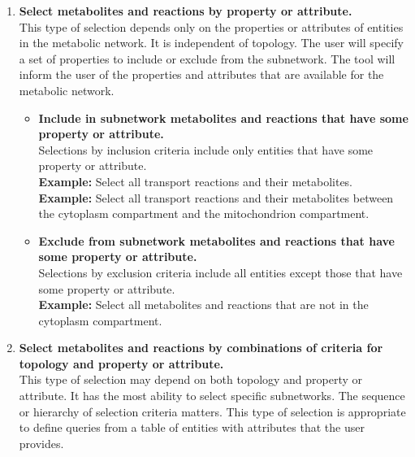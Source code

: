 \begin{enumerate}
\item \textbf{Select metabolites and reactions by property or attribute.}
\\ This type of selection depends only on the properties or attributes of entities in the metabolic network.
It is independent of topology.
The user will specify a set of properties to include or exclude from the subnetwork.
The tool will inform the user of the properties and attributes that are available for the metabolic network.

\begin{itemize}
\item \textbf{Include in subnetwork metabolites and reactions that have some property or attribute.}
\\ Selections by inclusion criteria include only entities that have some property or attribute.
\\ \textbf{Example:} Select all transport reactions and their metabolites.
\\ \textbf{Example:} Select all transport reactions and their metabolites between the cytoplasm compartment and the mitochondrion compartment.
\item \textbf{Exclude from subnetwork metabolites and reactions that have some property or attribute.}
\\ Selections by exclusion criteria include all entities except those that have some property or attribute.
\\ \textbf{Example:} Select all metabolites and reactions that are not in the cytoplasm compartment.

\end{itemize}

\item \textbf{Select metabolites and reactions by combinations of criteria for topology and property or attribute.}
\\ This type of selection may depend on both topology and property or attribute.
It has the most ability to select specific subnetworks.
The sequence or hierarchy of selection criteria matters.
This type of selection is appropriate to define queries from a table of entities with attributes that the user provides.
\begin{itemize}


\end{itemize}
\end{enumerate}
